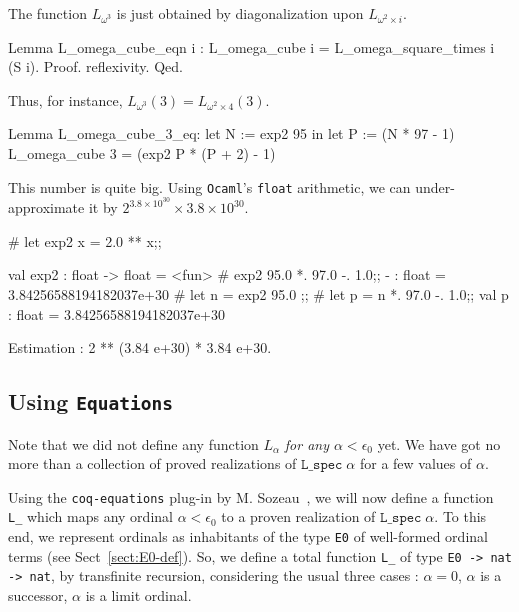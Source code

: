 The function  $L_{\omega^3}$  is just obtained by diagonalization upon $L_{\omega^2\times i}$.

\begin{Coqsrc}
Lemma L_omega_cube_eqn i : 
   L_omega_cube i = L_omega_square_times i (S i).
Proof. reflexivity. Qed.
\end{Coqsrc}

Thus, for instance, $L_{\omega^3}(3)=L_{\omega^2\times 4}(3)$.

\begin{Coqsrc}
Lemma L_omega_cube_3_eq:
   let N := exp2 95 in
   let P := (N * 97 - 1)%
   L_omega_cube 3  =  (exp2 P * (P + 2) - 1)%
\end{Coqsrc}


This number is quite big. Using \texttt{Ocaml}'s \texttt{float} arithmetic,
we can under-approximate it by $2^{3.8\times10^{30}}\times 3.8\times{10^{30}}$.

\begin{Coqsrc}
# let exp2 x = 2.0 ** x;;

val exp2 : float -> float = <fun>
#   exp2 95.0 *. 97.0 -. 1.0;;
- : float = 3.84256588194182037e+30
# let n = exp2 95.0 ;;
# let p = n *. 97.0 -. 1.0;;
val p : float = 3.84256588194182037e+30

Estimation :
2 ** (3.84 e+30) * 3.84 e+30.
\end{Coqsrc}


\subsection{Using \texttt{Equations}}
\label{sect:L-equations}

Note that we did not define any function $L_\alpha$ \emph{for any $\alpha<\epsilon_0$} yet. We have got no more than a collection of proved realizations of $\texttt{L\_spec}\;\alpha$ for a few values of $\alpha$.


Using the \texttt{coq-equations} plug-in by 
M. Sozeau~\cite{sozeau:hal-01671777}, we will now define a function \texttt{L\_} which maps any ordinal  $\alpha<\epsilon_0$ to a proven realization of 
$\texttt{L\_spec}\;\alpha$.   
To this end, we represent ordinals as inhabitants of the type 
\texttt{E0} of well-formed ordinal terms (see Sect~\vref{sect:E0-def}). So, we define a total function \texttt{L\_} of type
\texttt{E0 -> nat -> nat}, by transfinite recursion, considering the usual three cases : $\alpha=0$, $\alpha$ is a successor, $\alpha$ is a limit ordinal.
 

